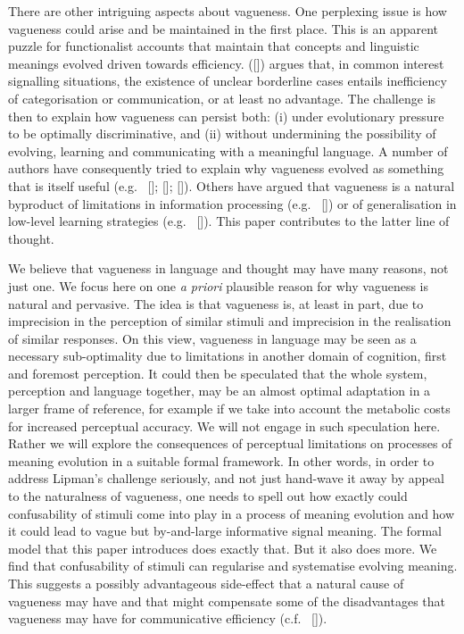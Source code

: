 \documentclass[12pt,english]{article}
\numberwithin{equation}{section}
\newcommand{\citetbjps}[1]{\citeauthor{#1} ([\citeyear{#1}])}
\newcommand{\citealtbjps}[1]{\citeauthor{#1} [\citeyear{#1}]}
\newcommand{\citepbjpspre}[2]{(#1~\citeauthor{#2} [\citeyear{#2}])}
\begin{document}
There are other intriguing aspects about vagueness. One perplexing issue is how vagueness
could arise and be maintained in the first place. This is an apparent puzzle for functionalist
accounts that maintain that concepts and linguistic meanings evolved driven towards
efficiency. \citetbjps{Lipman2009:Why-is-Language} argues that, in common interest signalling
situations, the existence of unclear borderline cases entails inefficiency of categorisation or
communication, or at least no advantage. The challenge is then to explain how vagueness
can persist both: (i) under evolutionary pressure to be optimally discriminative, and (ii)
without undermining the possibility of evolving, learning and communicating with a meaningful
language. A number of authors have consequently tried to explain why vagueness evolved as
something that is itself useful
(e.g.~\citealtbjps{Jaegherde-Jaegher2003:A-Game-Theoreti}; \citealtbjps{Deemter2009:Utility-and-Lan}; \citealtbjps{BlumeBoard2013:Intentional-Vag}).
Others have argued that vagueness is a natural byproduct of limitations in information
processing \citepbjpspre{e.g.}{FrankeJager2010:Vagueness-Signa} or of generalisation in low-level
learning strategies \citepbjpspre{e.g.}{OConnor2013:The-Evolution-o}. This paper contributes to the
latter line of thought.

We believe that vagueness in language and thought may have many reasons, not just one. We focus
here on one \emph{a priori} plausible reason for why vagueness is natural and pervasive. The
idea is that vagueness is, at least in part, due to imprecision in the perception of similar
stimuli and imprecision in the realisation of similar responses. On this view, vagueness in
language may be seen as a necessary sub-optimality due to limitations in another domain of
cognition, first and foremost perception. It could then be speculated that the whole system,
perception and language together, may be an almost optimal adaptation in a larger frame
of reference, for example if we take into account the metabolic costs for increased perceptual
accuracy. We will not engage in such speculation here. Rather we will explore the consequences
of perceptual limitations on processes of meaning evolution in a suitable formal framework. In
other words, in order to address Lipman's challenge seriously, and not just hand-wave it away
by appeal to the naturalness of vagueness, one needs to spell out how exactly could confusability
of stimuli come into play in a process of meaning evolution and how it could lead to
vague but by-and-large informative signal meaning. The formal model that this paper introduces
does exactly that. But it also does more. We find that confusability of stimuli can regularise
and systematise evolving meaning. This suggests a possibly advantageous side-effect that a
natural cause of vagueness may have and that might compensate some of the disadvantages that
vagueness may have for communicative efficiency \citepbjpspre{c.f.}{OConnor2013:The-Evolution-o}.
\end{document}

